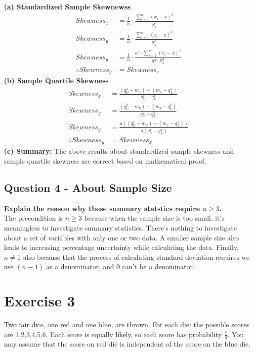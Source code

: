 \documentclass[
]{book}
\begin{document}
\textbf{(a) Standardized Sample Skewnewss}
\[\begin{aligned} 
Skewness_x &= \frac{1}{n} \cdot \frac{\sum_{i=1}^{n} (x_i - \bar{x})^3}{S_x^3} \\
Skewness_y &= \frac{1}{n} \cdot \frac{\sum_{i=1}^{n} (y_i - \bar{y})^3}{S_y^3} \\
Skewness_y &= \frac{1}{n} \cdot \frac{a^3 \cdot \sum_{i=1}^{n} (x_i - \bar{x})^3}{a^3 \cdot S_x^3} \\
\therefore Skewness_y &= Skewness_x
\end{aligned}\]
\textbf{(b) Sample Quartile Skewness}
\[\begin{aligned}
Skewness_x &= \frac{(q_U^x - m_x) - (m_x - q_L^x)}{q_U^x - q_L^x} \\
Skewness_y &= \frac{(q_U^y - m_y) - (m_y - q_L^y)}{q_U^y - q_L^y} \\
Skewness_y &= \frac{a((q_U^x - m_x) - (m_x - q_L^x))}{a(q_U^x - q_L^x)} \\
\therefore Skewness_y &= Skewness_x
\end{aligned}\]
\textbf{(c) Summary: } The above results about standardized sample skewness and sample quartile skewness are correct based on mathematical proof.

\section{Question 4 - About Sample Size}\label{question-4---about-sample-size}

\textbf{Explain the reason why these summary statstics require \(n \geq 3\).}\\
The precondition is \(n \geq 3\) because when the sample size is too small, it's meaningless to investigate summary statistics. There's nothing to investigate about a set of variables with only one or two data. A smaller sample size also leads to increasing percentage uncertainty while calculating the data. Finally, \(n \neq 1\) also because that the process of calculating standard deviation requires we use \((n-1)\) as a denominator, and 0 can't be a denominator.

\chapter{Exercise 3}\label{exercise-3}

Two fair dice, one red and one blue, are thrown. For each die: the possible scores are 1,2,3,4,5,6. Each
score is equally likely, so each score has probability \(\frac{1}{6}\). You may assume that the score on red die is
independent of the score on the blue die.
\end{document}
